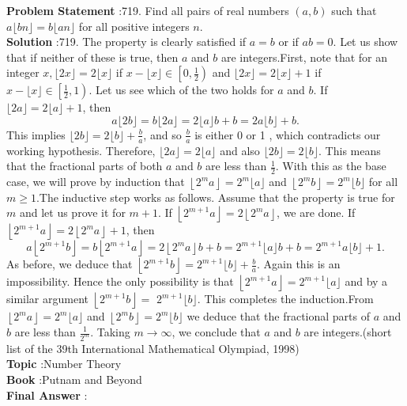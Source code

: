 \documentclass[10pt]{article}
\begin{document}
\textbf{Problem Statement} :719. Find all pairs of real numbers $(a, b)$ such that $a\lfloor b n\rfloor=b\lfloor a n\rfloor$ for all positive integers $n$.\\
\textbf{Solution} :719. The property is clearly satisfied if $a=b$ or if $a b=0$. Let us show that if neither of these is true, then $a$ and $b$ are integers.First, note that for an integer $x,\lfloor 2 x\rfloor=2\lfloor x\rfloor$ if $x-\lfloor x\rfloor \in\left[0, \frac{1}{2}\right)$ and $\lfloor 2 x\rfloor=2\lfloor x\rfloor+1$ if $x-\lfloor x\rfloor \in\left[\frac{1}{2}, 1\right)$. Let us see which of the two holds for $a$ and $b$. If $\lfloor 2 a\rfloor=2\lfloor a\rfloor+1$, then$$ a\lfloor 2 b\rfloor=b\lfloor 2 a\rfloor=2\lfloor a\rfloor b+b=2 a\lfloor b\rfloor+b . $$This implies $\lfloor 2 b\rfloor=2\lfloor b\rfloor+\frac{b}{a}$, and so $\frac{b}{a}$ is either 0 or 1 , which contradicts our working hypothesis. Therefore, $\lfloor 2 a\rfloor=2\lfloor a\rfloor$ and also $\lfloor 2 b\rfloor=2\lfloor b\rfloor$. This means that the fractional parts of both $a$ and $b$ are less than $\frac{1}{2}$. With this as the base case, we will prove by induction that $\left\lfloor 2^{m} a\right\rfloor=2^{m}\lfloor a\rfloor$ and $\left\lfloor 2^{m} b\right\rfloor=2^{m}\lfloor b\rfloor$ for all $m \geq 1$.The inductive step works as follows. Assume that the property is true for $m$ and let us prove it for $m+1$. If $\left\lfloor 2^{m+1} a\right\rfloor=2\left\lfloor 2^{m} a\right\rfloor$, we are done. If $\left\lfloor 2^{m+1} a\right\rfloor=2\left\lfloor 2^{m} a\right\rfloor+1$, then$$ a\left\lfloor 2^{m+1} b\right\rfloor=b\left\lfloor 2^{m+1} a\right\rfloor=2\left\lfloor 2^{m} a\right\rfloor b+b=2^{m+1}\lfloor a\rfloor b+b=2^{m+1} a\lfloor b\rfloor+1 . $$As before, we deduce that $\left\lfloor 2^{m+1} b\right\rfloor=2^{m+1}\lfloor b\rfloor+\frac{b}{a}$. Again this is an impossibility. Hence the only possibility is that $\left\lfloor 2^{m+1} a\right\rfloor=2^{m+1}\lfloor a\rfloor$ and by a similar argument $\left\lfloor 2^{m+1} b\right\rfloor=$ $2^{m+1}\lfloor b\rfloor$. This completes the induction.From $\left\lfloor 2^{m} a\right\rfloor=2^{m}\lfloor a\rfloor$ and $\left\lfloor 2^{m} b\right\rfloor=2^{m}\lfloor b\rfloor$ we deduce that the fractional parts of $a$ and $b$ are less than $\frac{1}{2^{m}}$. Taking $m \rightarrow \infty$, we conclude that $a$ and $b$ are integers.(short list of the 39th International Mathematical Olympiad, 1998)\\
\textbf{Topic} :Number Theory\\
\textbf{Book} :Putnam and Beyond\\
\textbf{Final Answer} :\\
\end{document}
